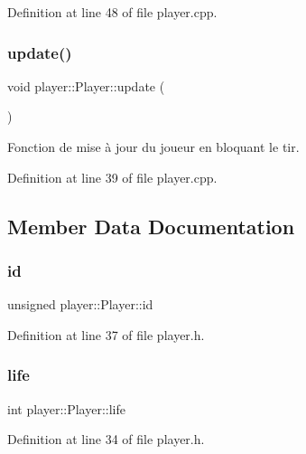 Definition at line 48 of file player.\+cpp.

\mbox{\label{structplayer_1_1_player_a8a9a40b3c690c1edf7146b1f7132cd64}} 
\subsubsection{\texorpdfstring{update()}{update()}}
{\footnotesize\ttfamily void player\+::\+Player\+::update (\begin{DoxyParamCaption}{ }\end{DoxyParamCaption})}



Fonction de mise à jour du joueur en bloquant le tir. 



Definition at line 39 of file player.\+cpp.



\subsection{Member Data Documentation}
\mbox{\label{structplayer_1_1_player_a40e8e3d989e0f045aca51d2e41239730}} 
\subsubsection{\texorpdfstring{id}{id}}
{\footnotesize\ttfamily unsigned player\+::\+Player\+::id}



Definition at line 37 of file player.\+h.

\mbox{\label{structplayer_1_1_player_a5a59435adc56ae2dd435c815f01d1e4d}} 
\subsubsection{\texorpdfstring{life}{life}}
{\footnotesize\ttfamily int player\+::\+Player\+::life}



Definition at line 34 of file player.\+h.

